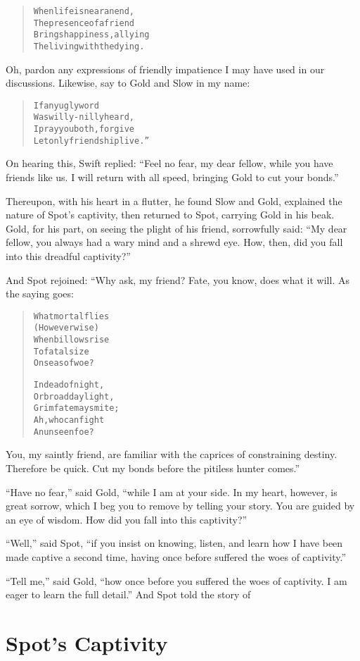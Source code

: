 \documentclass[article, twoside, 14pt]{memoir}
\renewenvironment{verbatim}{%
\begin{quote}%
\vskip -10pt%
\begin{alltt}\normalfont\large}{\end{alltt}%
\end{quote}%
\vskip -10pt
} %
\begin{document}
\begin{verbatim}
When life is near an end,
The presence of a friend
Brings happiness, allying
The living with the dying.
\end{verbatim}
Oh, pardon any expressions of friendly impatience I may have used
in our discussions. Likewise, say to Gold and Slow in my name:


\begin{verbatim}
If any ugly word
Was willy-nilly heard,
I pray you both, forgive{\textemdash}
Let only friendship live.”
\end{verbatim}
On hearing this, Swift replied:
``Feel no fear, my dear fellow, while you have friends like us. I will return with all speed, bringing Gold to cut your bonds.''

Thereupon, with his heart in a flutter, he found Slow and Gold,
explained the nature of Spot's captivity, then returned to Spot,
carrying Gold in his beak. Gold, for his part, on seeing the plight
of his friend, sorrowfully said:
``My dear fellow, you always had a wary mind and a shrewd eye. How, then, did you fall into this dreadful captivity?''

And Spot rejoined: “Why ask, my friend? Fate, you know, does what
it will. As the saying goes:

\begin{verbatim}
What mortal flies
(However wise)
When billows rise
To fatal size
    On seas of woe?

In dead of night,
Or broad daylight,
Grim fate may smite;
Ah, who can fight
    An unseen foe?
\end{verbatim}
You, my saintly friend, are familiar with the caprices of
constraining destiny. Therefore be quick. Cut my bonds before the
pitiless hunter comes.”

``Have no fear,'' said Gold,
``while I am at your side. In my heart, however, is great sorrow, which I beg you to remove by telling your story. You are guided by an eye of wisdom. How did you fall into this captivity?''

``Well,'' said Spot,
``if you insist on knowing, listen, and learn how I have been made captive a second time, having once before suffered the woes of captivity.''

``Tell me,'' said Gold,
``how once before you suffered the woes of captivity. I am eager to learn the full detail.''
And Spot told the story of

\chapter{Spot's Captivity}
\end{document}
